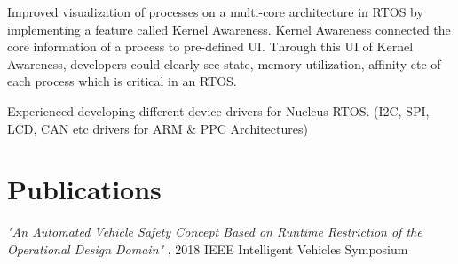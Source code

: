 \documentclass[]{deedy-resume-openfont}
\begin{document}
\begin{minipage}[t]{0.63\textwidth}
\begin{tightemize}

\item Improved visualization of processes on a multi-core architecture in RTOS by implementing a feature called Kernel Awareness. Kernel Awareness connected the core information of a process to pre-defined UI. Through this UI of Kernel Awareness, developers could clearly see state, memory utilization, affinity etc of each process which is critical in an RTOS.

\item Experienced developing different device drivers for Nucleus RTOS. (I2C, SPI, LCD, CAN etc drivers for ARM \& PPC Architectures)

\end{tightemize}
\sectionsep


\section{Publications}
\textit{"An Automated Vehicle Safety Concept Based on Runtime Restriction of the Operational Design Domain"} , 2018 IEEE Intelligent Vehicles Symposium

\sectionsep








\end{minipage}
\end{document}
